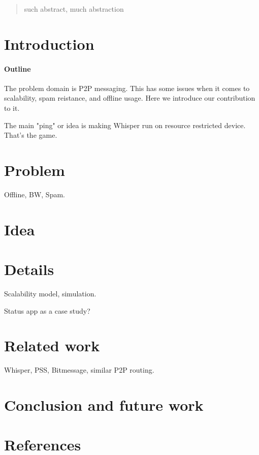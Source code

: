 \documentclass[12pt]{article}
\begin{document}
\maketitle
\begin{abstract}
  such abstract, much abstraction
\end{abstract}

\section{Introduction}

\paragraph{Outline}
The problem domain is P2P messaging. This has some issues when it comes to scalability, spam reistance, and offline usage. Here we introduce our contribution to it.

The main "ping" or idea is making Whisper run on resource restricted device. That's the game.

\section{Problem}
Offline, BW, Spam.

\section{Idea}
\section{Details}
Scalability model, simulation.

Status app as a case study?

\section{Related work}
Whisper, PSS, Bitmessage, similar P2P routing.
\section{Conclusion and future work}
\section{References}
\end{document}
